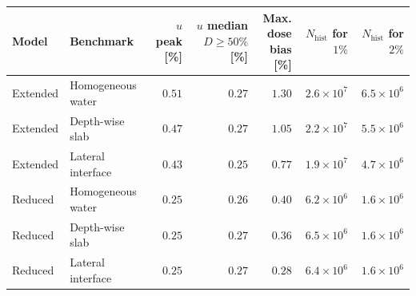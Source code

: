 \begin{tabular}{llrrrrr}
\toprule
Model & Benchmark & \shortstack{$u$ peak\\{}[\%]} & \shortstack{$u$ median\\$D\geq50\%$ [\%]} & \shortstack{Max. dose\\bias [\%]} & \shortstack{$N_{\mathrm{hist}}$\\for $1\%$} & \shortstack{$N_{\mathrm{hist}}$\\for $2\%$} \\
\midrule
Extended & Homogeneous water & $0.51$ & $0.27$ & $1.30$ & $2.6\times10^{7}$ & $6.5\times10^{6}$ \\
Extended & Depth-wise slab & $0.47$ & $0.27$ & $1.05$ & $2.2\times10^{7}$ & $5.5\times10^{6}$ \\
Extended & Lateral interface & $0.43$ & $0.25$ & $0.77$ & $1.9\times10^{7}$ & $4.7\times10^{6}$ \\
Reduced & Homogeneous water & $0.25$ & $0.26$ & $0.40$ & $6.2\times10^{6}$ & $1.6\times10^{6}$ \\
Reduced & Depth-wise slab & $0.25$ & $0.27$ & $0.36$ & $6.5\times10^{6}$ & $1.6\times10^{6}$ \\
Reduced & Lateral interface & $0.25$ & $0.27$ & $0.28$ & $6.4\times10^{6}$ & $1.6\times10^{6}$ \\
\bottomrule
\end{tabular}
